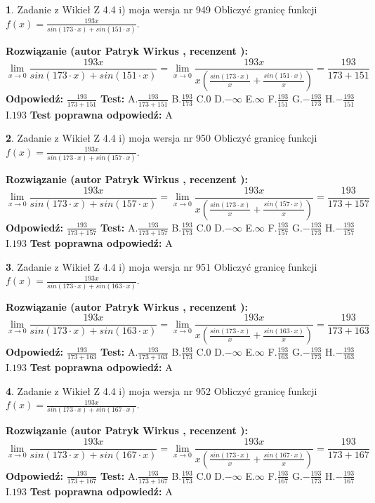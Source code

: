 \documentclass[12pt, a4paper]{article}
\theoremstyle{definition} %
\newtheorem{zad}{}
\newcommand{\zadStart}[1]{\begin{zad}#1\newline}
\newcommand{\zadStop}{\end{zad}}
\newcommand{\rozwStart}[2]{\noindent \textbf{Rozwiązanie (autor #1 , recenzent #2): }\newline}
\newcommand{\rozwStop}{\newline}
\newcommand{\odpStart}{\noindent \textbf{Odpowiedź:}\newline}
\newcommand{\odpStop}{\newline}
\newcommand{\testStart}{\noindent \textbf{Test:}\newline}
\newcommand{\testStop}{\newline}
\newcommand{\kluczStart}{\noindent \textbf{Test poprawna odpowiedź:}\newline}
\newcommand{\kluczStop}{\newline}
\begin{document}
\zadStart{Zadanie z Wikieł Z 4.4 i) moja wersja nr 949}
Obliczyć granicę funkcji $f(x)=\frac{193x}{sin(173\cdot x) +sin(151\cdot x)}$.
\zadStop
\rozwStart{Patryk Wirkus}{}
$$\lim\limits_{x\to 0}\frac{193x}{sin(173\cdot x) +sin(151\cdot x)}=\lim\limits_{x\to 0}\frac{193x}{x(\frac{sin(173\cdot x)}{x}+\frac{sin(151\cdot x)}{x})}=\frac{193}{173+151}$$
\rozwStop
\odpStart
$\frac{193}{173+151}$
\odpStop
\testStart
A.$\frac{193}{173+151}$
B.$\frac{193}{173}$
C.$0$
D.$-\infty$
E.$\infty$
F.$\frac{193}{151}$
G.$-\frac{193}{173}$
H.$-\frac{193}{151}$
I.$193$
\testStop
\kluczStart
A
\kluczStop



\zadStart{Zadanie z Wikieł Z 4.4 i) moja wersja nr 950}
Obliczyć granicę funkcji $f(x)=\frac{193x}{sin(173\cdot x) +sin(157\cdot x)}$.
\zadStop
\rozwStart{Patryk Wirkus}{}
$$\lim\limits_{x\to 0}\frac{193x}{sin(173\cdot x) +sin(157\cdot x)}=\lim\limits_{x\to 0}\frac{193x}{x(\frac{sin(173\cdot x)}{x}+\frac{sin(157\cdot x)}{x})}=\frac{193}{173+157}$$
\rozwStop
\odpStart
$\frac{193}{173+157}$
\odpStop
\testStart
A.$\frac{193}{173+157}$
B.$\frac{193}{173}$
C.$0$
D.$-\infty$
E.$\infty$
F.$\frac{193}{157}$
G.$-\frac{193}{173}$
H.$-\frac{193}{157}$
I.$193$
\testStop
\kluczStart
A
\kluczStop



\zadStart{Zadanie z Wikieł Z 4.4 i) moja wersja nr 951}
Obliczyć granicę funkcji $f(x)=\frac{193x}{sin(173\cdot x) +sin(163\cdot x)}$.
\zadStop
\rozwStart{Patryk Wirkus}{}
$$\lim\limits_{x\to 0}\frac{193x}{sin(173\cdot x) +sin(163\cdot x)}=\lim\limits_{x\to 0}\frac{193x}{x(\frac{sin(173\cdot x)}{x}+\frac{sin(163\cdot x)}{x})}=\frac{193}{173+163}$$
\rozwStop
\odpStart
$\frac{193}{173+163}$
\odpStop
\testStart
A.$\frac{193}{173+163}$
B.$\frac{193}{173}$
C.$0$
D.$-\infty$
E.$\infty$
F.$\frac{193}{163}$
G.$-\frac{193}{173}$
H.$-\frac{193}{163}$
I.$193$
\testStop
\kluczStart
A
\kluczStop



\zadStart{Zadanie z Wikieł Z 4.4 i) moja wersja nr 952}
Obliczyć granicę funkcji $f(x)=\frac{193x}{sin(173\cdot x) +sin(167\cdot x)}$.
\zadStop
\rozwStart{Patryk Wirkus}{}
$$\lim\limits_{x\to 0}\frac{193x}{sin(173\cdot x) +sin(167\cdot x)}=\lim\limits_{x\to 0}\frac{193x}{x(\frac{sin(173\cdot x)}{x}+\frac{sin(167\cdot x)}{x})}=\frac{193}{173+167}$$
\rozwStop
\odpStart
$\frac{193}{173+167}$
\odpStop
\testStart
A.$\frac{193}{173+167}$
B.$\frac{193}{173}$
C.$0$
D.$-\infty$
E.$\infty$
F.$\frac{193}{167}$
G.$-\frac{193}{173}$
H.$-\frac{193}{167}$
I.$193$
\testStop
\kluczStart
A
\kluczStop
\end{document}
